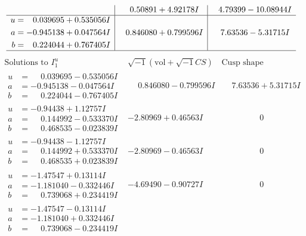 \documentclass[1p]{elsarticle_modified}
\theoremstyle{definition}
\newcommand{\I}{\sqrt{-1}}
\begin{document}
$$\begin{array}{c|c|c}
 & \phantom{-}0.50891 + 4.92178 I & \phantom{-}4.79399 - 10.08944 I \\ \hline\begin{aligned}
u &= \phantom{-}0.039695 + 0.535056 I \\
a &= -0.945138 + 0.047564 I \\
b &= \phantom{-}0.224044 + 0.767405 I\end{aligned}
 & \phantom{-}0.846080 + 0.799596 I & \phantom{-}7.63536 - 5.31715 I\\
 \hline 
 \end{array}$$\newpage$$\begin{array}{c|c|c}  
\text{Solutions to }I^u_{1}& \I (\text{vol} + \sqrt{-1}CS) & \text{Cusp shape}\\
 \hline 
\begin{aligned}
u &= \phantom{-}0.039695 - 0.535056 I \\
a &= -0.945138 - 0.047564 I \\
b &= \phantom{-}0.224044 - 0.767405 I\end{aligned}
 & \phantom{-}0.846080 - 0.799596 I & \phantom{-}7.63536 + 5.31715 I \\ \hline\begin{aligned}
u &= -0.94438 + 1.12757 I \\
a &= \phantom{-}0.144992 - 0.533370 I \\
b &= \phantom{-}0.468535 - 0.023839 I\end{aligned}
 & -2.80969 + 0.46563 I & \phantom{-0.000000 } 0 \\ \hline\begin{aligned}
u &= -0.94438 - 1.12757 I \\
a &= \phantom{-}0.144992 + 0.533370 I \\
b &= \phantom{-}0.468535 + 0.023839 I\end{aligned}
 & -2.80969 - 0.46563 I & \phantom{-0.000000 } 0 \\ \hline\begin{aligned}
u &= -1.47547 + 0.13114 I \\
a &= -1.181040 - 0.332446 I \\
b &= \phantom{-}0.739068 + 0.234419 I\end{aligned}
 & -4.69490 - 0.90727 I & \phantom{-0.000000 } 0 \\ \hline\begin{aligned}
u &= -1.47547 - 0.13114 I \\
a &= -1.181040 + 0.332446 I \\
b &= \phantom{-}0.739068 - 0.234419 I\end{aligned}

\end{array}$$
\end{document}
